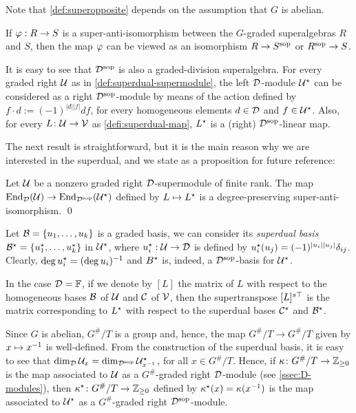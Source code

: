 Note that \cref{def:superopposite} depends on the assumption that $G$ is abelian. 

\begin{remark}\label{rmk:sop-super-anti-iso}
    If $\varphi:R \to S$ is a super-anti-isomorphism between the $G$-graded superalgebras $R$ and $S$, then the map $\varphi$ can be viewed as an isomorphism $R\to S^{\mathrm{sop}}$ or $R^{\mathrm{sop}} \to S$.
\end{remark}

It is easy to see that $\mathcal{D}^{\mathrm{sop}}$ is also a graded-division superalgebra. 
For every graded right $\mathcal U$ as in \cref{def:superdual-supermodule}, the left $\mathcal{D}$-module $\mathcal U^\star$ can be considered as a right $\mathcal{D}^{\mathrm{sop}}$-module by means of the action defined by $f\cdot d := (-1)^{|d||f|} df$, for every homogeneous elements $d\in \mathcal{D}$ and $f\in \mathcal U^\star$. 
Also, for every $L\colon \mathcal U \to \mathcal V$ as \cref{defi:superdual-map}, $L^\star$ is a (right) $\mathcal{D}^{\mathrm{sop}}$-linear map. 

The next result is straightforward, but it is the main reason why we are interested in the superdual, and we state as a proposition for future reference:

\begin{prop}\label{prop:dual-super-anti-iso}
    Let $\mathcal U$ be a nonzero graded right $\mathcal{D}$-supermodule of finite rank. 
    The map $\operatorname{End}_{\mathcal{D}} (\mathcal U) \rightarrow \operatorname{End}_{\mathcal{D}^{\mathrm{sop}}} (\mathcal U^\star)$ defined by $L \mapsto L^\star$ is a degree-preserving super-anti-isomorphism. \qed 
\end{prop}

\begin{defi}
    Let $\mathcal B = \{u_1, \ldots, u_k\}$ is a graded basis, we can consider its \emph{superdual basis} $\mathcal B^\star = \{u_1^\star, \ldots, u_k^\star\}$ in $\mathcal U^\star$, where $u_i^\star : \mathcal U \rightarrow \mathcal{D}$ is defined by $u_i^\star (u_j) = (-1)^{|u_i||u_j|} \delta_{ij}$. 
    Clearly, $\deg u_i^\star = (\deg u_i)^{-1}$ and $B^\star$ is, indeed, a $\mathcal{D}^{\mathrm{sop}}$-basis for $\mathcal U^\star$.
\end{defi}

\begin{remark}
	In the case $\mathcal{D}=\mathbb{F}$, if we denote by $[L]$ the matrix of $L$ with respect to the homogeneous bases $\mathcal B$ of $\mathcal U$ and $\mathcal C$ of $\mathcal V$, then the supertranspose $[L]^{s\top}$ is the matrix corresponding to $L^\star$ with respect to the superdual bases $\mathcal C^\star$ and $\mathcal B^\star$.
\end{remark}

Since $G$ is abelian, $G^\#/T$ is a group and, hence, the map $G^\#/T \to G^\#/T$ given by $x \mapsto x^{-1}$ is well-defined. 
From the construction of the superdual basis, it is easy to see that $\dim_{\mathcal{D}} \mathcal U_x = \dim_{\mathcal{D}^{\mathrm{sop}}} \mathcal U^\star_{x^{-1}}$, for all $x \in G^\#/T$. 
Hence, if $\kappa\colon G^\#/T \to \mathbb{Z}_{\geq 0}$ is the map associated to $\mathcal U$ as a $G^\#$-graded right $\mathcal{D}$-module (see \cref{ssec:D-modules}), then $\kappa^\star \colon G^\#/T \to \mathbb{Z}_{\geq 0}$ defined by $\kappa^\star (x) = \kappa (x^{-1})$ is the map associated to $\mathcal U^\star$ as a $G^\#$-graded right $\mathcal{D}^{\mathrm{sop}}$-module.

